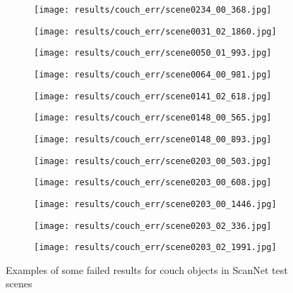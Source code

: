 \begin{figure}[h!]
  \centering
  \begin{subfigure}[b]{0.32\linewidth}
    \texttt{[image: results/couch\_err/scene0234\_00\_368.jpg]}
  \end{subfigure}
  \begin{subfigure}[b]{0.32\linewidth}
    \texttt{[image: results/couch\_err/scene0031\_02\_1860.jpg]}
  \end{subfigure}
  \begin{subfigure}[b]{0.32\linewidth}
    \texttt{[image: results/couch\_err/scene0050\_01\_993.jpg]}
  \end{subfigure}
  \begin{subfigure}[b]{0.32\linewidth}
    \texttt{[image: results/couch\_err/scene0064\_00\_981.jpg]}
  \end{subfigure}
  \begin{subfigure}[b]{0.32\linewidth}
    \texttt{[image: results/couch\_err/scene0141\_02\_618.jpg]}
  \end{subfigure}
  \begin{subfigure}[b]{0.32\linewidth}
    \texttt{[image: results/couch\_err/scene0148\_00\_565.jpg]}
  \end{subfigure}
  \begin{subfigure}[b]{0.32\linewidth}
    \texttt{[image: results/couch\_err/scene0148\_00\_893.jpg]}
  \end{subfigure}
  \begin{subfigure}[b]{0.32\linewidth}
    \texttt{[image: results/couch\_err/scene0203\_00\_503.jpg]}
  \end{subfigure}
  \begin{subfigure}[b]{0.32\linewidth}
    \texttt{[image: results/couch\_err/scene0203\_00\_608.jpg]}
  \end{subfigure}
  \begin{subfigure}[b]{0.32\linewidth}
    \texttt{[image: results/couch\_err/scene0203\_00\_1446.jpg]}
  \end{subfigure}
  \begin{subfigure}[b]{0.32\linewidth}
    \texttt{[image: results/couch\_err/scene0203\_02\_336.jpg]}
  \end{subfigure}
  \begin{subfigure}[b]{0.32\linewidth}
    \texttt{[image: results/couch\_err/scene0203\_02\_1991.jpg]}
  \end{subfigure}
  \caption{Examples of some failed results for couch objects in ScanNet test scenes}
  \label{fig:result_couch_err}
\end{figure}

